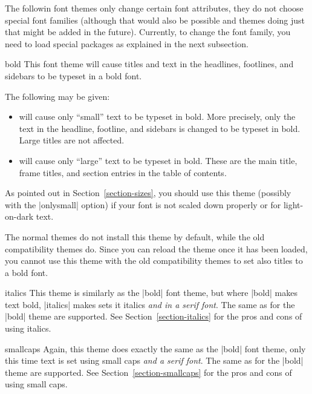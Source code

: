 The followin font themes only change certain font attributes, they do
not choose special font families (although that would also be possible
and themes doing just that might be added in the future). Currently,
to change the font family, you need to load special packages as
explained in the next subsection.



\begin{fontthemeexample}{bold}
  This font theme will cause titles and text in the headlines,
  footlines, and sidebars to be typeset in a bold font.

  The following  may be given:
  \begin{itemize}
  \item
    will cause only ``small'' text to be typeset in bold. More
    precisely, only the text in the headline, footline, and sidebars
    is changed to be typeset in bold. Large titles are not affected.
  \item
    will cause only ``large'' text to be typeset in bold. These are
    the main title, frame titles, and section entries in the table of
    contents.     
  \end{itemize}

  As pointed out in Section~\ref{section-sizes}, you should use this
  theme (possibly with the |onlysmall| option) if your font is not
  scaled down properly or for light-on-dark text.

  The normal themes do not install this theme by default, while the
  old compatibility themes do. Since you can reload the theme once it
  has been loaded, you cannot use this theme with the old
  compatibility themes to set also titles to a bold font. 
\end{fontthemeexample}

\begin{fontthemeexample}{italics}
  This theme is similarly as the |bold| font theme, but where |bold|
  makes text bold, |italics| makes sets it italics \emph{and in a
    serif font}. The same  as for the |bold| theme are
  supported. See Section~\ref{section-italics} for the pros and cons
  of using italics.  
\end{fontthemeexample}

\begin{fontthemeexample}{smallcaps}
  Again, this theme does exactly the same as the |bold| font theme,
  only this time text is set using small caps \emph{and a serif
    font}. The same  as for the |bold| theme are
  supported. See Section~\ref{section-smallcaps} for the pros and cons
  of using small caps.  
\end{fontthemeexample}

